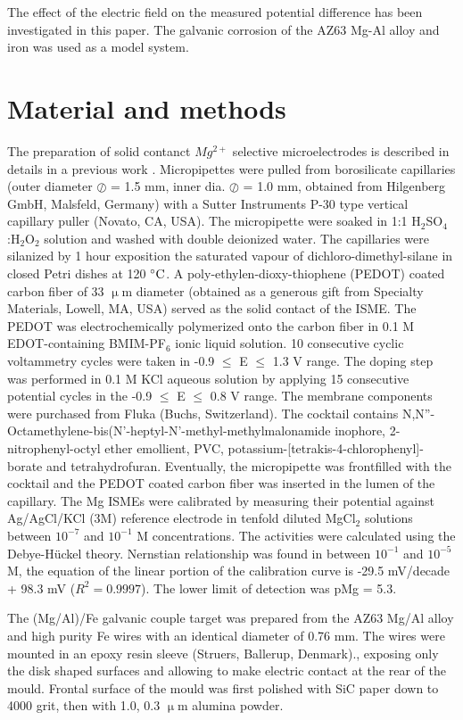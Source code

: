 \documentclass[3p]{elsarticle}
\begin{document}
The effect of the electric field on the measured potential difference has been investigated in this paper. The galvanic corrosion of the AZ63 Mg-Al alloy and iron was used as a model system.

\section{Material and methods}

The preparation of solid contanct $Mg^{2+}$ selective microelectrodes is described in details in a previous work \cite{overmg3}. Micropipettes were pulled from borosilicate capillaries (outer diameter $\oslash$ = 1.5 mm, inner dia. $\oslash$ = 1.0 mm, obtained from Hilgenberg GmbH, Malsfeld, Germany) with a Sutter Instruments P-30 type vertical capillary puller (Novato, CA, USA). The micropipette were soaked in 1:1 H$_2$SO$_4$:H$_2$O$_2$ solution and washed with double deionized water. The capillaries were silanized by 1 hour exposition the saturated vapour of dichloro-dimethyl-silane in closed Petri dishes at 120 $\celsius$. A poly-ethylen-dioxy-thiophene (PEDOT) coated carbon fiber of 33 $\upmu$m diameter (obtained as a generous gift from Specialty Materials, Lowell, MA, USA) served as the solid contact of the ISME. The PEDOT was electrochemically polymerized onto the carbon fiber in 0.1 M EDOT-containing BMIM-PF$_6$ ionic liquid solution. 10 consecutive cyclic voltammetry cycles were taken in -0.9 $\leq$ E $\leq$ 1.3 V range. The doping step was performed in 0.1 M KCl aqueous solution by applying 15 consecutive potential cycles in the -0.9 $\leq$ E $\leq$ 0.8 V range. The membrane components were purchased from Fluka (Buchs, Switzerland). The cocktail contains N,N''-Octamethylene-bis(N'-heptyl-N'-methyl-methylmalonamide inophore, 2-nitrophenyl-octyl ether emollient, PVC, potassium-[tetrakis-4-chlorophenyl]-borate and tetrahydrofuran. Eventually, the micropipette was frontfilled with the cocktail and the PEDOT coated carbon fiber was inserted in the lumen of the capillary.
The Mg ISMEs were calibrated by measuring their potential against Ag/AgCl/KCl (3M) reference electrode in tenfold diluted MgCl$_2$ solutions between $10^{-7}$ and $10^{-1}$ M concentrations. The activities were calculated using the Debye-Hückel theory. Nernstian relationship was found in between $10^{-1}$ and $10^{-5}$ M, the equation of the linear portion of the calibration curve is -29.5 mV/decade + 98.3 mV ($R^2=0.9997$). The lower limit of detection was pMg = 5.3. 

The (Mg/Al)/Fe galvanic couple target was prepared from the AZ63 Mg/Al alloy and high purity Fe wires with an identical diameter of 0.76 mm. The wires were mounted in an epoxy resin sleeve (Struers, Ballerup, Denmark)., exposing only the disk shaped surfaces and allowing to make electric contact at the rear of the mould. Frontal surface of the mould was first polished with SiC paper down to 4000 grit, then with 1.0, 0.3 $\upmu$m alumina powder.
\end{document}
